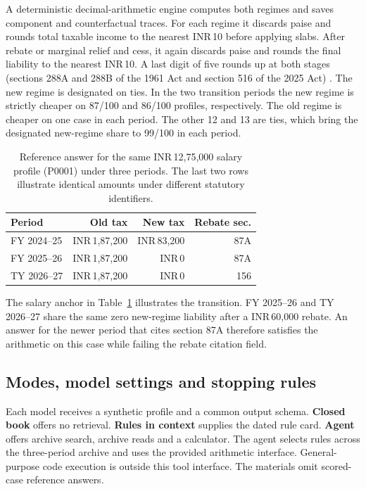 \documentclass[10pt,letterpaper,twocolumn]{article}
\begin{document}
A deterministic decimal-arithmetic engine computes both regimes and saves component and counterfactual traces. For each regime it discards paise and rounds total taxable income to the nearest INR\,10 before applying slabs. After rebate or marginal relief and cess, it again discards paise and rounds the final liability to the nearest INR\,10. A last digit of five rounds up at both stages (sections 288A and 288B of the 1961 Act and section 516 of the 2025 Act) \cite{round288a,round288b,act2025}. The new regime is designated on ties. In the two transition periods the new regime is strictly cheaper on 87/100 and 86/100 profiles, respectively. The old regime is cheaper on one case in each period. The other 12 and 13 are ties, which bring the designated new-regime share to 99/100 in each period.

\begin{table}[!tb]
  \centering\small
  \setlength{\tabcolsep}{3pt}
  \caption{Reference answer for the same INR\,12,75,000 salary profile (P0001) under three periods. The last two rows illustrate identical amounts under different statutory identifiers.}
  \label{tab:worked-example}
  \begin{tabular*}{\columnwidth}{@{\extracolsep{\fill}}lrrr@{}}
    \toprule
    \textbf{Period} & \textbf{Old tax} & \textbf{New tax} & \textbf{Rebate sec.} \\
    \midrule
    FY 2024--25 & INR\,1,87,200 & INR\,83,200 & 87A \\
    FY 2025--26 & INR\,1,87,200 & INR\,0 & 87A \\
    TY 2026--27 & INR\,1,87,200 & INR\,0 & 156 \\
    \bottomrule
  \end{tabular*}
\end{table}

The salary anchor in Table~\ref{tab:worked-example} illustrates the transition. FY 2025--26 and TY 2026--27 share the same zero new-regime liability after a INR\,60,000 rebate. An answer for the newer period that cites section 87A therefore satisfies the arithmetic on this case while failing the rebate citation field.

\subsection{Modes, model settings and stopping rules}

Each model receives a synthetic profile and a common output schema. \textbf{Closed book} offers no retrieval. \textbf{Rules in context} supplies the dated rule card. \textbf{Agent} offers archive search, archive reads and a calculator. The agent selects rules across the three-period archive and uses the provided arithmetic interface. General-purpose code execution is outside this tool interface. The materials omit scored-case reference answers.
\end{document}
